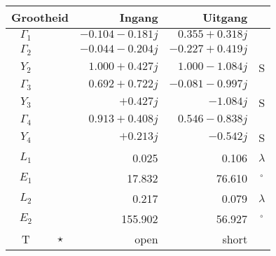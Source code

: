 \begin{tabular}{|cc|r|r|c|} 
\hline \multicolumn{2}{|c|}{\textbf{Grootheid}} & \textbf{Ingang} & \textbf{Uitgang} & \\ 
\hline $\Gamma_1$ & \color{blue}{$\star$} & $-0.104 -0.181 j$ & $0.355 +0.318 j$ &  \\ 
\hline $\Gamma_2$ & \color{green}{$\star$} & $-0.044 -0.204 j$ & $-0.227 +0.419 j$ &  \\ 
$Y_2$ & \color{green}{$\star$} & $1.000 +0.427 j$ & $1.000 -1.084 j$ & S \\ 
\hline $\Gamma_3$ & \color{cyan}{$\star$} & $0.692 +0.722 j$ & $-0.081 -0.997 j$ &  \\ 
$Y_3$ & \color{cyan}{$\star$} & $+0.427 j$ & $-1.084 j$ & S \\ 
\hline $\Gamma_4$ & \color{magenta}{$\star$} & $0.913 +0.408 j$ & $0.546 -0.838 j$ &  \\ 
$Y_4$ & \color{magenta}{$\star$} & $+0.213 j$ & $-0.542 j$ & S \\ 
\hline $L_1$ & \color{blue}{\textbf{--}} & 0.025 & 0.106 & ${\lambda}$ \\ 
$E_1$ & \color{blue}{\textbf{--}} & 17.832 & 76.610 & $^{\circ}$ \\ 
\hline $L_2$ & \color{blue}{\textbf{--}} & 0.217 & 0.079 & ${\lambda}$ \\ 
$E_2$ & \color{magenta}{\textbf{--}} & 155.902 & 56.927 & $^{\circ}$ \\ 
\hline T & $\star$ & open & short &  \\ 
\hline \end{tabular} 

